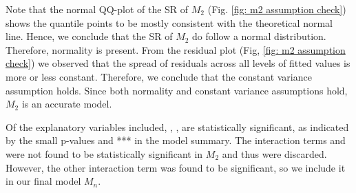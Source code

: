 Note that the normal QQ-plot of the SR of $M_2$ (Fig. \ref{fig: m2 assumption check}) shows the quantile points to be mostly consistent with the theoretical normal line. Hence, we conclude that the SR of $M_2$ do follow a normal distribution. Therefore, normality is present. From the residual plot (Fig, \ref{fig: m2 assumption check}) we observed that the spread of residuals across all levels of fitted values is more or less constant. Therefore, we conclude that the constant variance assumption holds. Since both normality and constant variance assumptions hold, $M_2$ is an accurate model.

Of the explanatory variables included, , ,  are statistically significant, as indicated by the small p-values and *** in the model summary. The interaction terms \newline{} and  were not found to be statistically significant in $M_2$ and thus were discarded. However, the other interaction term  was found to be significant, so we include it in our final model $M_n$.

